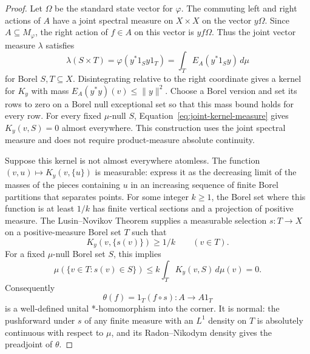 \begin{proof}
Let $\Omega$ be the standard state vector for $\varphi$.
The commuting left and right actions of $A$ have a joint spectral
measure on $X\times X$ on the vector $y\Omega$.
Since $A\subseteq M_\varphi$, the right action of $f\in A$ on this
vector is $yf\Omega$.  Thus the joint vector measure $\lambda$ satisfies
\begin{equation}\label{eq:joint-kernel-measure}
 \lambda(S\times T)
 =\varphi(y^*1_Sy1_T)
 =\int_T E_A(y^*1_Sy)\,d\mu
\end{equation}
for Borel $S,T\subseteq X$.
Disintegrating relative to the right coordinate gives a kernel for
$K_y$ with mass $E_A(y^*y)(v)\leq\|y\|^2$.
Choose a Borel version and set its rows to zero on a Borel null exceptional
set so that this mass bound holds for every row.
For every fixed $\mu$-null $S$, Equation~\eqref{eq:joint-kernel-measure}
gives $K_y(v,S)=0$ almost everywhere.  This construction uses the joint
spectral measure and does not require product-measure absolute
continuity.

Suppose this kernel is not almost everywhere atomless.  The function
$(v,u)\mapsto K_y(v,\{u\})$ is measurable: express it as the decreasing
limit of the masses of the pieces containing $u$ in an increasing sequence
of finite Borel partitions that separates points. For some integer $k\geq1$, the Borel
set where this function is at least $1/k$ has finite vertical sections
and a projection of positive measure.  The Lusin--Novikov Theorem
\cite[Theorem~18.10]{Kec95} supplies a measurable selection
$s\colon T\to X$ on a positive-measure Borel set $T$ such that
\begin{equation}\label{eq:selected-atom}
 K_y(v,\{s(v)\})\geq1/k\qquad(v\in T).
\end{equation}
For a fixed $\mu$-null Borel set $S$, this implies
\[
 \mu(\{v\in T:s(v)\in S\})
 \leq k\int_T K_y(v,S)\,d\mu(v)=0.
\]
Consequently
\[
 \theta(f)=1_T(f\circ s)\colon A\longrightarrow A1_T
\]
is a well-defined unital *-homomorphism into the corner.  It is normal:
the pushforward under $s$ of any finite measure with an $L^1$ density
on $T$ is absolutely continuous with respect to $\mu$, and its
Radon--Nikodym density gives the preadjoint of $\theta$.


\end{proof}
